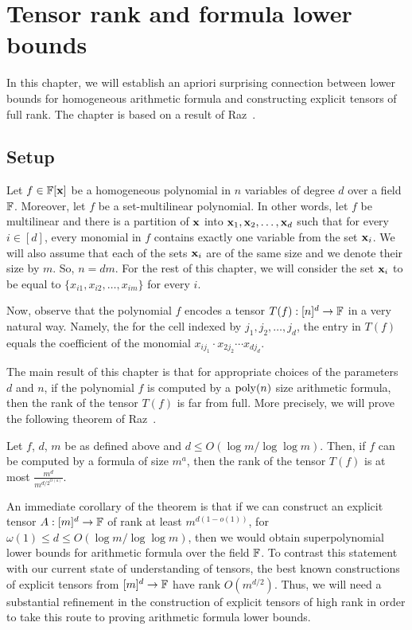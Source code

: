 \chapter{Tensor rank and formula lower bounds}\label{chap:tensorrk}

In this chapter, we will establish an apriori surprising connection between lower bounds for homogeneous arithmetic formula and constructing explicit tensors of full rank.
The chapter is based on a result of Raz~\cite{raz10}.

\section{Setup}
Let $f \in \mathbb{F}[\mathbf{x}]$ be a homogeneous polynomial in $n$ variables of degree $d$ over a field $\mathbb{F}$.
Moreover, let $f$ be a set-multilinear polynomial.
In other words, let $f$ be multilinear and there is a partition of $\mathbf{x}$ into $\mathbf{x}_1, \mathbf{x}_2, \ldots, \mathbf{x}_d$ such that for every $i \in [d]$, every monomial in $f$ contains exactly one variable from the set $\mathbf{x}_i$.
We will also assume that each of the sets $\mathbf{x}_i$ are of the same size and we denote their size by $m$.
So, $n = dm$.
For the rest of this chapter, we will consider the set $\mathbf{x}_i$ to be equal to $\{x_{i1}, x_{i2}, \ldots, x_{im}\}$ for every $i$.

Now, observe that the polynomial $f$ encodes a tensor $T(f):[n]^d \rightarrow \mathbb{F}$ in a very natural way.
Namely, the for the cell indexed by $j_1, j_2, \ldots, j_{d}$, the entry in $T(f)$ equals the coefficient of the monomial $x_{ij_1}\cdot x_{2j_2}\cdots x_{dj_d}$.

The main result of this chapter is that for appropriate choices of the parameters $d$ and $n$, if the polynomial $f$ is computed by a $\operatorname{poly}(n)$ size arithmetic formula, then the rank of the tensor $T(f)$ is far from full.
More precisely, we will prove the following theorem of Raz~\cite{raz10}.

\begin{theorem}\label{thm:tensor rank}
  Let $f$, $d$, $m$ be as defined above and $d \leq O(\log m/\log\log m)$.
Then, if $f$ can be computed by a formula of size $m^{a}$, then the rank of the tensor $T(f)$ is at most $\frac{m^{d}}{m^{d/2^{O(a)}}}$.
\end{theorem}

An immediate corollary of the theorem is that if we can construct an explicit tensor $A:[m]^d\rightarrow \mathbb{F}$ of rank at least $m^{d(1-o(1))}$, for $\omega(1) \leq d \leq O(\log m/\log\log m)$, then we would obtain superpolynomial lower bounds for arithmetic formula over the field $\mathbb{F}$.
To contrast this statement with our current state of understanding of tensors, the best known constructions of explicit tensors from $[m]^d\rightarrow \mathbb{F}$ have rank $O(m^{d/2})$.
Thus, we will need a substantial refinement in the construction of explicit tensors of high rank in order to take this route to proving arithmetic formula lower bounds.

